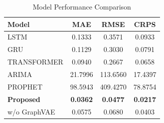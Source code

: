 \begin{table}[h]
\centering
\caption{Model Performance Comparison}
\label{tab:model_comparison}
\begin{tabular}{lccc}
\hline
Model & MAE & RMSE & CRPS \\
\hline
LSTM & 0.1333 & 0.3571 & 0.0933 \\
GRU & 0.1129 & 0.3030 & 0.0791 \\
TRANSFORMER & 0.0940 & 0.2667 & 0.0658 \\
ARIMA & 21.7996 & 113.6560 & 17.4397 \\
PROPHET & 98.5943 & 409.4270 & 78.8754 \\
\textbf{Proposed} & \textbf{0.0362} & \textbf{0.0477} & \textbf{0.0217} \\
w/o GraphVAE & 0.0575 & 0.0680 & 0.0403 \\
\hline
\end{tabular}
\end{table}
